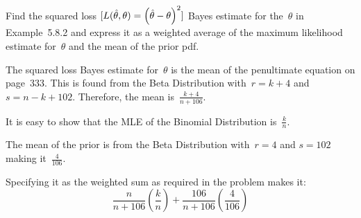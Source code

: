 \begin{problem}
   Find the squared loss ${\lbrack L(\hat{\theta},\theta) = \left(\hat{\theta} - \theta\right)^2\rbrack}$ Bayes estimate for the~$\theta$ in Example~5.8.2 and express it as a weighted average of the maximum likelihood estimate for~$\theta$ and the mean of the prior pdf.
\end{problem}

The squared loss Bayes estimate for~$\theta$ is the mean of the penultimate equation on page~333.  This is found from the Beta Distribution with~${r = k + 4}$ and~${s = n - k + 102}$.  Therefore, the mean is~$\frac{k+4}{n+106}$.

\noindent
It is easy to show that the MLE of the Binomial Distribution is~${\frac{k}{n}}$.

\noindent
The mean of the prior is from the Beta Distribution with~${r=4}$ and ${s=102}$ making it~${\frac{4}{106}}$.

\noindent
Specifying it as the weighted sum as required in the problem makes it:
\begin{equation}
  \boxed{\frac{n}{n+106}\left(\frac{k}{n}\right) + \frac{106}{n + 106} \left(\frac{4}{106}\right)}
\end{equation}
